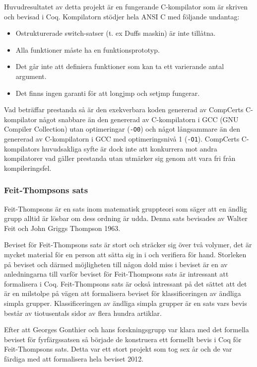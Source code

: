 Huvudresultatet av detta projekt är en fungerande C-kompilator som är skriven
och bevisad i Coq. Kompilatorn stödjer hela ANSI C med följande undantag:
\begin{itemize}
  \item Ostrukturerade switch-satser (t. ex Duffs maskin) är inte tillåtna.
  \item Alla funktioner måste ha en funktionsprototyp.
  \item Det går inte att definiera funktioner som kan ta ett
    varierande antal argument.
  \item Det finns ingen garanti för att longjmp och setjmp fungerar.
\end{itemize}
Vad beträffar prestanda så är den exekverbara koden genererad av
CompCerts C-kompilator något snabbare än den genererad av
C-kompilatorn i GCC (GNU Compiler Collection) utan optimeringar
(\texttt{-O0}) och något långsammare än den genererad av
C-kompilatorn i GCC med optimeringsnivå 1 (\texttt{-O1}). CompCerts
C-kompilators huvudsakliga syfte är dock inte att konkurrera mot
andra kompilatorer vad gäller prestanda utan utmärker sig genom
att vara fri från kompileringsfel.

\subsubsection{Feit-Thompsons sats}
Feit-Thompsons är en sats inom matematisk gruppteori som säger att en ändlig
grupp alltid är lösbar om dess ordning är udda\cite{aschbacher2004status}.
Denna sats bevisades av Walter Feit och John Griggs Thompson 1963.

Beviset för Feit-Thompsons sats är stort och sträcker sig över två volymer, det
är mycket material för en person att sätta sig in i och verifiera för hand.
Storleken på beviset och därmed möjligheten till någon dold miss i beviset är
en av anledningarna till varför beviset för Feit-Thompsons sats är intressant
att formalisera i Coq. Feit-Thompsons sats är också intressant på det sättet
att det är en milstolpe på vägen att formalisera beviset för klassificeringen
av ändliga simpla grupper. Klassificeringen av ändliga simpla grupper är en
sats vars bevis består av tiotusentals sidor av flera hundra artiklar.

Efter att Georges Gonthier och hans forskningsgrupp var klara med det formella
beviset för fyrfärgssatsen så började de konstruera ett formellt bevis i Coq
för Feit-Thompsons sats\autocite{gonthierfinished}. Detta var ett stort projekt
som tog sex år och de var färdiga med att formalisera hela beviset 2012.

